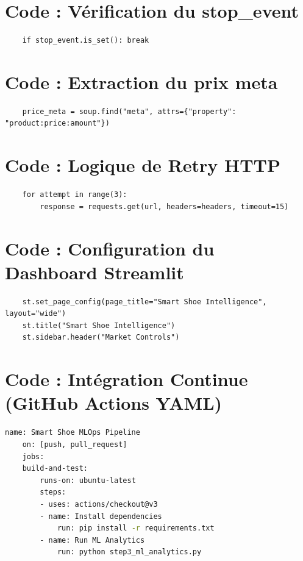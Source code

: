 \documentclass[11pt,a4paper,oneside]{report}
\begin{document}
    \section{Code : Vérification du stop\_event}
    \begin{lstlisting}
    if stop_event.is_set(): break
    \end{lstlisting}

    \section{Code : Extraction du prix meta}
    \begin{lstlisting}
    price_meta = soup.find("meta", attrs={"property": "product:price:amount"})
    \end{lstlisting}

    \section{Code : Logique de Retry HTTP}
    \begin{lstlisting}
    for attempt in range(3):
        response = requests.get(url, headers=headers, timeout=15)
    \end{lstlisting}

    \section{Code : Configuration du Dashboard Streamlit}
    \begin{lstlisting}
    st.set_page_config(page_title="Smart Shoe Intelligence", layout="wide")
    st.title("Smart Shoe Intelligence")
    st.sidebar.header("Market Controls")
    \end{lstlisting}

    \section{Code : Intégration Continue (GitHub Actions YAML)}
    \begin{lstlisting}[language=bash]
    name: Smart Shoe MLOps Pipeline
    on: [push, pull_request]
    jobs:
    build-and-test:
        runs-on: ubuntu-latest
        steps:
        - uses: actions/checkout@v3
        - name: Install dependencies
            run: pip install -r requirements.txt
        - name: Run ML Analytics
            run: python step3_ml_analytics.py
    \end{lstlisting}
\end{document}
